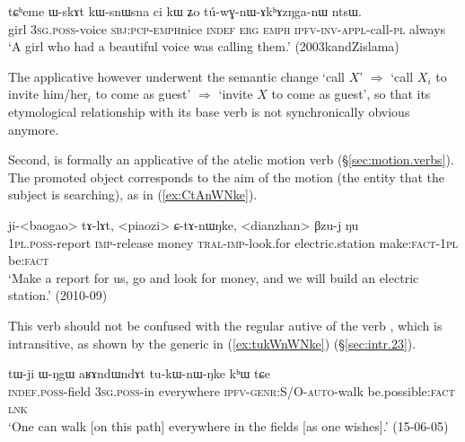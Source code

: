 \begin{exe}
\ex \label{ex:tuwGnAkhAzNganW}
\gll  tɕʰeme ɯ-skɤt kɯ-snɯ\redp{}sna ci kɯ ʑo tú-wɣ-nɯ-ɤkʰɤzŋga-nɯ ntsɯ. \\
girl \textsc{3sg}.\textsc{poss}-voice \textsc{sbj}:\textsc{pcp}-\textsc{emph}\redp{}nice \textsc{indef} \textsc{erg} \textsc{emph} \textsc{ipfv}-\textsc{inv}-\textsc{appl}-call-\textsc{pl} always \\
\glt `A girl who had a beautiful voice was calling them.' (2003kandZislama)
\end{exe}

The applicative  however underwent the semantic change `call $X$' $\Rightarrow$ `call $X_i$ to invite him/her$_i$ to come as guest' $\Rightarrow$ `invite $X$ to come as guest', so that its etymological relationship with its base verb  is not synchronically obvious anymore.


Second,   is formally an applicative of the atelic motion verb  (§\ref{sec:motion.verbs}). The promoted object corresponds to the aim of the motion (the entity that the subject is searching), as in (\ref{ex:CtAnWNke}).

\begin{exe}
\ex \label{ex:CtAnWNke}
\gll   ji-<baogao> tɤ-lɤt, <piaozi> ɕ-tɤ-nɯŋke, <dianzhan> βzu-j ŋu \\
\textsc{1pl}.\textsc{poss}-report \textsc{imp}-release money \textsc{tral}-\textsc{imp}-look.for electric.station make:\textsc{fact}-\textsc{1pl} be:\textsc{fact} \\
\glt `Make a report for us, go and look for money, and we will build an electric station.' (2010-09)
\end{exe}

This verb should not be confused with the regular autive  of the verb , which is intransitive, as shown by the generic  in (\ref{ex:tukWnWNke}) (§\ref{sec:intr.23}).

\begin{exe}
\ex \label{ex:tukWnWNke}
\gll tɯ-ji ɯ-ŋgɯ aʁɤndɯndɤt tu-kɯ-nɯ-ŋke kʰɯ tɕe \\
\textsc{indef}.\textsc{poss}-field \textsc{3sg}.\textsc{poss}-in everywhere \textsc{ipfv}-\textsc{genr}:S/O-\textsc{auto}-walk be.possible:\textsc{fact} \textsc{lnk} \\
\glt `One can walk [on this path] everywhere in the fields [as one wishes].' (15-06-05)
\end{exe}

